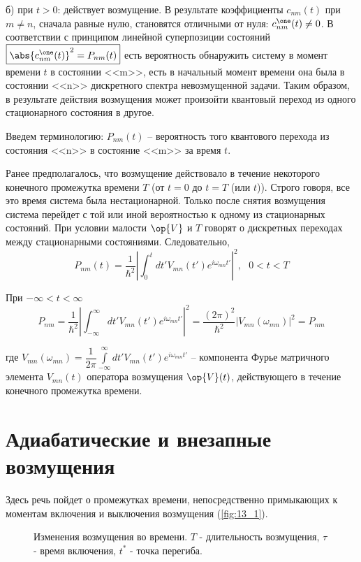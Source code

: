б) при $t > 0$: действует возмущение. В результате коэффициенты $c_{nm}(t)$ при $m \neq n$, сначала равные нулю, становятся отличными от нуля: $c_{nm}^\one(t) \neq 0$. В соответствии с принципом линейной суперпозиции состояний $\boxed{\abs{c_{nm}^\one (t)}^2 = P_{nm}(t)}$ есть вероятность обнаружить систему в момент времени $t$ в состоянии <<m>>, есть в начальный момент времени она была в состоянии <<n>> дискретного спектра невозмущенной задачи. Таким образом, в результате действия возмущения может произойти квантовый переход из одного стационарного состояния в другое.

Введем терминологию: $P_{nm}(t)$ -- вероятность того квантового перехода из состояния <<n>> в состояние <<m>> за время $t$. 

Ранее предполагалось, что возмущение действовало в течение некоторого конечного промежутка времени $T$ (от $t = 0$ до $t = T$ (или $t$)). Строго говоря, все это время система была нестационарной. Только после снятия возмущения система перейдет с той или иной вероятностью к одному из стационарных состояний. При условии малости $\op{V}$ и $T$ говорят о дискретных переходах между стационарными состояниями. Следовательно,  
$$
P_{nm}(t) =\frac{1}{\hbar^2} \left | \int_0^t dt' V_{mn}(t') e^{i \omega_{mn} t'} \right |^2, ~~~0 < t < T
$$

При $-\infty < t < \infty$
$$
P_{nm} = \frac{1}{\hbar^2} \left | \int_{-\infty}^\infty dt' V_{mn}(t')e^{i \omega_{mn}t'} \right |^2 = \boxed{\frac{(2\pi)^2}{\hbar^2} \left | V_{mn}(\omega_{mn})\right|^2} = P_{nm}
$$

где $V_{mn}(\omega_{mn}) = \dfrac{1}{2\pi} \int \limits_{-\infty}^\infty dt' V_{mn}(t') e^{i\omega_{mn}t'}$ -- компонента Фурье матричного элемента $V_{mn}(t)$ оператора возмущения $\op{V}(t)$, действующего в течение конечного промежутка времени.

\section{Адиабатические и внезапные возмущения}

Здесь речь пойдет о промежутках времени, непосредственно примыкающих к моментам включения и выключения возмущения (\autoref{fig:13_1}).
\begin{figure}[h!]
\centering
{}
\caption{Изменения возмущения во времени. $T$ - длительность возмущения, $\tau$ - время включения, $t^*$ - точка перегиба.} \label{fig:13_1}
\end{figure}

